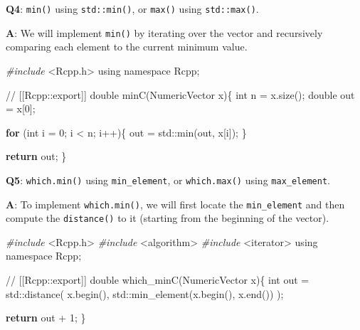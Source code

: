 \documentclass[
]{krantz}
\makeatletter
\newenvironment{Shaded}{\begin{snugshade}}{\end{snugshade}}
\newcommand{\BuiltInTok}[1]{#1}
\newcommand{\CommentTok}[1]{\textcolor[rgb]{0.56,0.35,0.01}{\textit{#1}}}
\newcommand{\ControlFlowTok}[1]{\textcolor[rgb]{0.13,0.29,0.53}{\textbf{#1}}}
\newcommand{\DataTypeTok}[1]{\textcolor[rgb]{0.13,0.29,0.53}{#1}}
\newcommand{\DecValTok}[1]{\textcolor[rgb]{0.00,0.00,0.81}{#1}}
\newcommand{\ImportTok}[1]{#1}
\newcommand{\KeywordTok}[1]{\textcolor[rgb]{0.13,0.29,0.53}{\textbf{#1}}}
\newcommand{\NormalTok}[1]{#1}
\newcommand{\PreprocessorTok}[1]{\textcolor[rgb]{0.56,0.35,0.01}{\textit{#1}}}
\newenvironment{kframe}{%
\medskip{}
\setlength{\fboxsep}{.8em}
 \def\at@end@of@kframe{}%
 \ifinner\ifhmode%
  \def\at@end@of@kframe{\end{minipage}}%
  \begin{minipage}{\columnwidth}%
 \fi\fi%
 \def\FrameCommand##1{\hskip\@totalleftmargin \hskip-\fboxsep
 \colorbox{shadecolor}{##1}\hskip-\fboxsep
     \hskip-\linewidth \hskip-\@totalleftmargin \hskip\columnwidth}%
 \MakeFramed {\advance\hsize-\width
   \@totalleftmargin\z@ \linewidth\hsize
   \@setminipage}}%
 {\par\unskip\endMakeFramed%
 \at@end@of@kframe}
\renewenvironment{Shaded}{\begin{kframe}}{\end{kframe}}
\renewcommand{\KeywordTok} [1]{\textcolor[rgb]{0.00,0.44,0.13}{{#1}}}
\renewcommand{\DataTypeTok}[1]{\textcolor[rgb]{0.56,0.13,0.00}{{#1}}}
\renewcommand{\DecValTok}  [1]{\textcolor[rgb]{0.25,0.63,0.44}{{#1}}}
\renewcommand{\CommentTok} [1]{\textcolor[rgb]{0.38,0.63,0.69}{{#1}}}
\renewcommand{\NormalTok}  [1]{{#1}}
\makeatother
\begin{document}
\textbf{{Q4}}: \texttt{min()} using \texttt{std::min()}, or \texttt{max()} using \texttt{std::max()}.

\textbf{{A}}: We will implement \texttt{min()} by iterating over the vector and recursively comparing each element to the current minimum value.

\begin{Shaded}
\begin{Highlighting}[]
\PreprocessorTok{#include }\ImportTok{<Rcpp.h>}
\KeywordTok{using} \KeywordTok{namespace}\NormalTok{ Rcpp;}

\CommentTok{// [[Rcpp::export]]}
\DataTypeTok{double}\NormalTok{ minC(NumericVector x)\{}
  \DataTypeTok{int}\NormalTok{ n = x.size();}
  \DataTypeTok{double}\NormalTok{ out = x[}\DecValTok{0}\NormalTok{];}
  
  \ControlFlowTok{for}\NormalTok{ (}\DataTypeTok{int}\NormalTok{ i = }\DecValTok{0}\NormalTok{; i < n; i++)\{}
\NormalTok{    out = }\BuiltInTok{std::}\NormalTok{min(out, x[i]);}
\NormalTok{  \}}
  
  \ControlFlowTok{return}\NormalTok{ out;}
\NormalTok{\}}
\end{Highlighting}
\end{Shaded}

\textbf{{Q5}}: \texttt{which.min()} using \texttt{min\_element}, or \texttt{which.max()} using \texttt{max\_element}.

\textbf{{A}}: To implement \texttt{which.min()}, we will first locate the \texttt{min\_element} and then compute the \texttt{distance()} to it (starting from the beginning of the vector).

\begin{Shaded}
\begin{Highlighting}[]
\PreprocessorTok{#include }\ImportTok{<Rcpp.h>}
\PreprocessorTok{#include }\ImportTok{<algorithm>}
\PreprocessorTok{#include }\ImportTok{<iterator>}
\KeywordTok{using} \KeywordTok{namespace}\NormalTok{ Rcpp;}

\CommentTok{// [[Rcpp::export]]}
\DataTypeTok{double}\NormalTok{ which_minC(NumericVector x)\{}
  \DataTypeTok{int}\NormalTok{ out = }\BuiltInTok{std::}\NormalTok{distance(}
\NormalTok{    x.begin(), }\BuiltInTok{std::}\NormalTok{min_element(x.begin(), x.end())}
\NormalTok{  );}

  \ControlFlowTok{return}\NormalTok{ out + }\DecValTok{1}\NormalTok{;}
\NormalTok{\}}
\end{Highlighting}
\end{Shaded}
\end{document}
